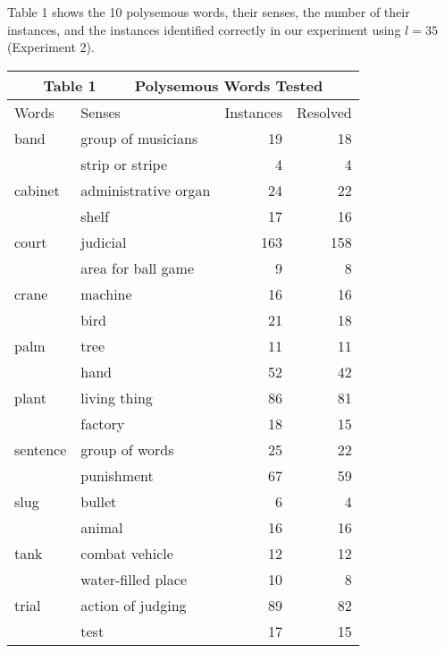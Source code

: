 Table 1 shows the 10 polysemous words, their senses, the number of their instances, and the 
instances identified correctly in our experiment using $l=35$ (Experiment 2).
\vspace{0.2cm}
\begin{center} \footnotesize 
  \begin{tabular}{llrr} 
   \multicolumn{4}{c}{\small {\bf Table 1}~~~~ Polysemous Words Tested} \\ \hline
   Words & Senses & Instances & Resolved \\ \hline
   band  &  group of musicians	&  19	&  18	\\
	      & strip or stripe	  & 4	 &  4	\\			
   cabinet & administrative organ &	 24 & 22 \\	
	      & shelf	&  17	&  16	\\				
   court &	judicial &	163 &	158	\\
	      & area for ball game &  9	&   8	\\				
   crane &	machine &	 16 &	 16	\\
	      & bird	& 21 &	 18	\\				
   palm &	tree &	 11 &	 11	\\
	     & hand	 & 52	&  42	\\				
   plant &	living thing &	 86 &	 81 \\	
      	& factory	&  18	 & 15	\\				
   sentence &	group of words &	 25 &	 22	\\
	       & punishment &	 67	&  59	\\				
   slug &	bullet	&   6	&   4	\\
	     & animal	&  16	&  16	\\				
    tank &	combat vehicle &	 12 &	 12	\\
      	& water-filled place &	 10 &	  8 \\				
    trial &	action of judging	 & 89 &	 82	\\
	     & test	&  17	&  15	\\ \hline
  \end{tabular}
\end{center}
\vspace{0.2cm}


